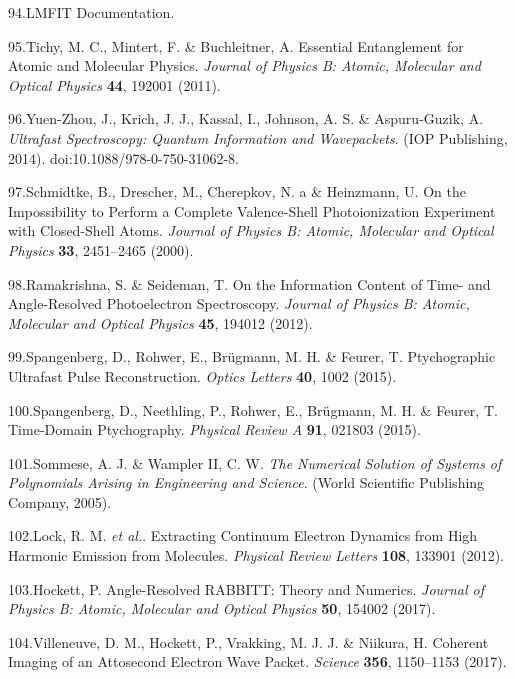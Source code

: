 \documentclass[10pt]{article}
\begin{document}
\label{csl:94}94.{{{LMFIT}} Documentation}.

\label{csl:95}95.Tichy, M. C., Mintert, F. \& Buchleitner, A. {Essential Entanglement for Atomic and Molecular Physics}. \textit{Journal of Physics B: Atomic, Molecular and Optical Physics} \textbf{44}, 192001 (2011).

\label{csl:96}96.{Yuen-Zhou}, J., Krich, J. J., Kassal, I., Johnson, A. S. \& {Aspuru-Guzik}, A. \textit{{Ultrafast {{Spectroscopy}}: {{Quantum Information}} and {{Wavepackets}}}}. ({IOP Publishing}, 2014). doi:10.1088/978-0-750-31062-8.

\label{csl:97}97.Schmidtke, B., Drescher, M., Cherepkov, N. a \& Heinzmann, U. {On the Impossibility to Perform a Complete Valence-Shell Photoionization Experiment with Closed-Shell Atoms}. \textit{Journal of Physics B: Atomic, Molecular and Optical Physics} \textbf{33}, 2451–2465 (2000).

\label{csl:98}98.Ramakrishna, S. \& Seideman, T. {On the Information Content of Time- and Angle-Resolved Photoelectron Spectroscopy}. \textit{Journal of Physics B: Atomic, Molecular and Optical Physics} \textbf{45}, 194012 (2012).

\label{csl:99}99.Spangenberg, D., Rohwer, E., Br{\"u}gmann, M. H. \& Feurer, T. {Ptychographic Ultrafast Pulse Reconstruction}. \textit{Optics Letters} \textbf{40}, 1002 (2015).

\label{csl:100}100.Spangenberg, D., Neethling, P., Rohwer, E., Br{\"u}gmann, M. H. \& Feurer, T. {Time-Domain Ptychography}. \textit{Physical Review A} \textbf{91}, 021803 (2015).

\label{csl:101}101.Sommese, A. J. \& Wampler II, C. W. \textit{{The {{Numerical Solution}} of {{Systems}} of {{Polynomials Arising}} in {{Engineering}} and {{Science}}}}. ({World Scientific Publishing Company}, 2005).

\label{csl:102}102.Lock, R. M. \textit{et al.}. {Extracting {{Continuum Electron Dynamics}} from {{High Harmonic Emission}} from {{Molecules}}}. \textit{Physical Review Letters} \textbf{108}, 133901 (2012).

\label{csl:103}103.Hockett, P. {Angle-Resolved {{RABBITT}}: Theory and Numerics}. \textit{Journal of Physics B: Atomic, Molecular and Optical Physics} \textbf{50}, 154002 (2017).

\label{csl:104}104.Villeneuve, D. M., Hockett, P., Vrakking, M. J. J. \& Niikura, H. {Coherent Imaging of an Attosecond Electron Wave Packet}. \textit{Science} \textbf{356}, 1150–1153 (2017).
\end{document}
